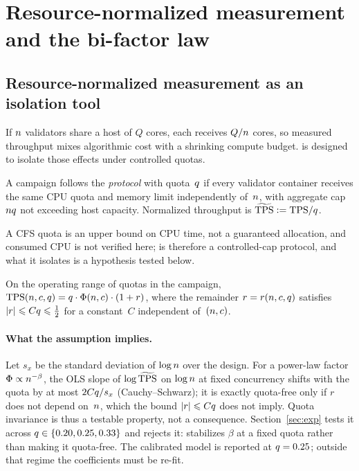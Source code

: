 \section{Resource-normalized measurement and the bi-factor law}
\label{sec:model}

\subsection{Resource-normalized measurement as an isolation tool}

If $n$ validators share a host of $Q$ cores, each receives $Q/n$ cores, so
measured throughput mixes algorithmic cost with a shrinking compute budget.
\RNM{} is designed to isolate those effects under controlled quotas.

\begin{Def}
\label{def:rnm}
A campaign follows the \emph{\RNM{} protocol} with quota~$q$ if every validator
container receives the same CPU quota and memory limit independently of~$n$,
with aggregate cap $nq$ not exceeding host capacity. Normalized
throughput is
$\widetilde{\mathrm{TPS}}\mathrel{\mathop:}=\mathrm{TPS}/q$.
\end{Def}

A CFS quota is an upper bound on CPU time, not a guaranteed allocation, and
consumed CPU is not verified here; \RNM{} is therefore a controlled-cap
protocol, and what it isolates is a hypothesis tested below.

\begin{Assumption}
\label{as:separable}
On the operating range of quotas in the campaign,
$\mathrm{TPS}(n,c,q)=q\cdot\Phi(n,c)\cdot(1+r)$, where the remainder
$r=r(n,c,q)$ satisfies $|r|\leqslant Cq\leqslant\tfrac12$ for a
constant~$C$ independent of~$(n,c)$.
\end{Assumption}

\paragraph{What the assumption implies.}
Let $s_x$ be the standard deviation of $\log n$ over the design. For a power-law
factor $\Phi\propto n^{-\beta}$, the OLS slope of $\log\widetilde{\mathrm{TPS}}$ on $\log n$ at
fixed concurrency shifts with the quota by at most $2Cq/s_x$
(Cauchy--Schwarz); it is exactly quota-free only if $r$ does not depend
on~$n$, which the bound $|r|\leqslant Cq$ does not imply. Quota invariance is thus
a testable property, not a consequence. Section~\ref{sec:exp} tests it across
$q\in\{0.20,0.25,0.33\}$ and rejects it: \RNM{} stabilizes
$\beta$ at a fixed quota rather than making it quota-free. The calibrated model
is reported at $q=0.25$; outside that regime the coefficients must be re-fit.

